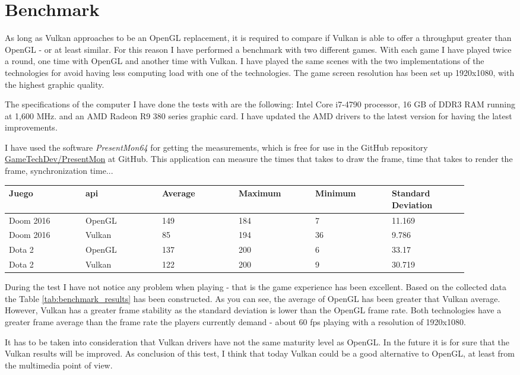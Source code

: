 \chapter{Benchmark}
As long as Vulkan approaches to be an OpenGL replacement, it is required to compare if Vulkan is able to offer
a throughput greater than OpenGL - or at least similar. For this reason I have performed a benchmark with two different
games. With each game I have played twice a round, one time with OpenGL and another time with Vulkan. I have played the
same scenes with the two implementations of the technologies for avoid having less computing load with one of the
technologies. The game screen resolution has been set up 1920x1080, with the highest graphic quality.

The specifications of the computer I have done the tests with are the following: Intel Core i7-4790 processor, 16 GB
of DDR3 RAM running at 1,600 MHz. and an AMD Radeon R9 380 series graphic card. I have updated the AMD drivers to the
latest version for having the latest improvements.

I have used the software \emph{PresentMon64} for getting the measurements, which is free for use in the GitHub
repository \href{https://github.com/GameTechDev/PresentMon}{GameTechDev/PresentMon} at GitHub. This application can
measure the times that takes to draw the frame, time that takes to render the frame, synchronization time...

\begin{table*}[t]
  \centering
  \begin{tabular}{p{0.15\linewidth}p{0.15\linewidth}p{0.15\linewidth}p{0.15\linewidth}p{0.15\linewidth}p{0.15\linewidth}}
    \toprule
    Juego & \gls{api}    & Average & Maximum & Minimum & Standard Deviation \\
    \midrule
    Doom 2016   & OpenGL  & 149 & 184 & 7   & 11.169 \\
    Doom 2016   & Vulkan  & 85  & 194 & 36  & 9.786 \\
    Dota 2      & OpenGL  & 137 & 200 & 6   & 33.17 \\
    Dota 2      & Vulkan  & 122 & 200 & 9   & 30.719 \\
    \bottomrule
  \end{tabular}
  \caption{Bencharmk Results. Measured as \gls{fps}.}
  \label{tab:benchmark_results}
\end{table*}

During the test I have not notice any problem when playing - that is the game experience has been excellent. Based
on the collected data the Table \ref{tab:benchmark_results} has been constructed. As you can see, the average of
OpenGL has been greater that Vulkan average. However, Vulkan has a greater frame stability as the standard deviation
is lower than the OpenGL frame rate. Both technologies have a greater frame average than the frame rate the players
currently demand - about 60 \gls{fps} playing with a resolution of 1920x1080.

It has to be taken into consideration that Vulkan drivers have not the same maturity level as OpenGL. In the future
it is for sure that the Vulkan results will be improved. As conclusion of this test, I think that today Vulkan could
be a good alternative to OpenGL, at least from the multimedia point of view.
